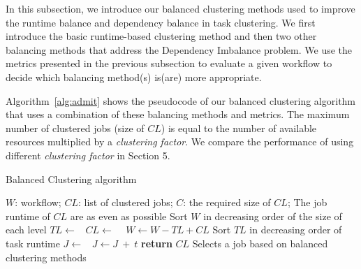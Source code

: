 \documentclass[final]{IEEEtran}
\begin{document}
In this subsection, we introduce our balanced clustering methods used to improve the runtime balance and dependency balance in task clustering. We first introduce the basic runtime-based clustering method and then two other balancing methods that address the Dependency Imbalance problem. We use the metrics presented in the previous subsection to evaluate a given workflow to decide which balancing method(s) is(are) more appropriate. 

Algorithm~\ref{alg:admit} shows the pseudocode of our balanced clustering algorithm that uses a combination of these balancing methods and metrics.  The maximum number of clustered jobs (size of $CL$) is equal to the number of available resources multiplied by a \emph{clustering factor}. We compare the performance of using different \emph{clustering factor} in Section 5. 

\begin{algorithm}[htb]
	\caption{ Balanced Clustering algorithm}
	\footnotesize
	\label{alg:admit}
	\begin{algorithmic}[1]
		\Require $W$: workflow; $CL$: list of clustered jobs; $C$: the required size of $CL$; 
		\Ensure The job runtime of $CL$ are as even as possible
			\State Sort $W$ in decreasing order of the size of each level
				\State $TL\gets $\  
				\State $CL\gets$  \  
				\State $W \gets W - TL + CL$   
			\EndFor
		\EndProcedure
			\State Sort $TL$ in decreasing order of task runtime
				\State $J \gets $\  
				\State  $J \gets J\ +\ t$ 
			\EndFor
			\State \textbf{return} $CL$
		\EndProcedure
			\State Selects a job based on balanced clustering methods
		\EndProcedure
	\end{algorithmic}
\end{algorithm}
\end{document}
